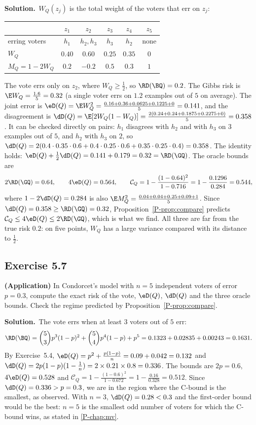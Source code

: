 \documentclass[11pt]{article}
\newcommand{\statement}[1]{\begin{tcolorbox}[enhanced,breakable,colback=black!3,colframe=black!25,boxrule=0.4pt,sharp corners,fontupper=\itshape\small]#1\end{tcolorbox}}
\newcommand{\exo}[1]{\Needspace{6\baselineskip}\subsection*{Exercise #1}\addcontentsline{toc}{subsection}{Exercise #1}}
\newcommand{\sol}{\noindent\textbf{Solution.}\ }
\begin{document}
\sol $W_Q(z_j)$ is the total weight of the voters that err on $z_j$:
\begin{center}\small
\begin{tabular}{lccccc}
\toprule
 & $z_1$ & $z_2$ & $z_3$ & $z_4$ & $z_5$ \\
\midrule
erring voters & $h_1$ & $h_2,h_3$ & $h_3$ & $h_2$ & none \\
$W_Q$ & $0.40$ & $0.60$ & $0.25$ & $0.35$ & $0$ \\
$M_Q=1-2W_Q$ & $0.2$ & $-0.2$ & $0.5$ & $0.3$ & $1$ \\
\bottomrule
\end{tabular}
\end{center}
The vote errs only on $z_2$, where $W_Q\geq\frac12$, so $\RD(\BQ)=0.2$. The Gibbs risk is $\E W_Q=\frac{1.6}5=0.32$ (a single voter errs on
$1.2$ examples out of $5$ on average). The joint error is $\eD(Q)=\E W_Q^2=\frac{0.16+0.36+0.0625+0.1225+0}{5}=0.141$, and the
disagreement is $\dD(Q)=\E[2W_Q(1-W_Q)]=\frac{2(0.24+0.24+0.1875+0.2275+0)}{5}=0.358$. It can be checked directly on pairs: $h_1$
disagrees with $h_2$ and with $h_3$ on $3$ examples out of $5$, and $h_2$ with $h_3$ on $2$, so
$\dD(Q)=2(0.4\cdot0.35\cdot0.6+0.4\cdot0.25\cdot0.6+0.35\cdot0.25\cdot0.4)=0.358$. The identity holds:
$\eD(Q)+\frac12\dD(Q)=0.141+0.179=0.32=\RD(\GQ)$. The oracle bounds are
\[
2\RD(\GQ)=0.64,\qquad 4\eD(Q)=0.564,\qquad
\mathcal C_Q=1-\frac{(1-0.64)^2}{1-0.716}=1-\frac{0.1296}{0.284}=0.544,
\]
where $1-2\dD(Q)=0.284$ is also $\E M_Q^2=\frac{0.04+0.04+0.25+0.09+1}5$. Since $\dD(Q)=0.358\geq\RD(\GQ)=0.32$, Proposition~\ref{P-prop:compare}
predicts $\mathcal C_Q\leq4\eD(Q)\leq2\RD(\GQ)$, which is what we find. All three are far from the true risk $0.2$: on five points, $W_Q$
has a large variance compared with its distance to $\frac12$.

\exo{5.7}
\statement{\textbf{(Application)} In Condorcet's model with $n=5$ independent voters of error $p=0.3$, compute the exact risk of the
vote, $\eD(Q)$, $\dD(Q)$ and the three oracle bounds. Check the regime predicted by Proposition~\ref{P-prop:compare}.}

\sol The vote errs when at least $3$ voters out of $5$ err:
\[
\RD(\BQ)=\binom53p^3(1-p)^2+\binom54p^4(1-p)+p^5=0.1323+0.02835+0.00243=0.1631.
\]
By Exercise~5.4, $\eD(Q)=p^2+\frac{p(1-p)}n=0.09+0.042=0.132$ and $\dD(Q)=2p(1-p)(1-\frac1n)=2\times0.21\times0.8=0.336$. The bounds are
$2p=0.6$, $4\eD(Q)=0.528$ and $\mathcal C_Q=1-\frac{(1-0.6)^2}{1-0.672}=1-\frac{0.16}{0.328}=0.512$. Since $\dD(Q)=0.336>p=0.3$, we are in the region where
the C-bound is the smallest, as observed. With $n=3$, $\dD(Q)=0.28<0.3$ and the first-order bound would be the best: $n=5$
is the smallest odd number of voters for which the C-bound wins, as stated in \cref{P-chap:mv}.
\end{document}
